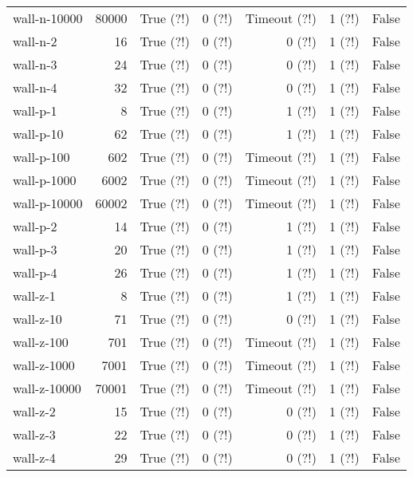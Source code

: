 \begin{longtable}{lrlrrrl}
wall-n-10000 & 80000 & True (?!) & 0 (?!) & Timeout (?!) & 1 (?!) & False \\
wall-n-2 & 16 & True (?!) & 0 (?!) & 0 (?!) & 1 (?!) & False \\
wall-n-3 & 24 & True (?!) & 0 (?!) & 0 (?!) & 1 (?!) & False \\
wall-n-4 & 32 & True (?!) & 0 (?!) & 0 (?!) & 1 (?!) & False \\
wall-p-1 & 8 & True (?!) & 0 (?!) & 1 (?!) & 1 (?!) & False \\
wall-p-10 & 62 & True (?!) & 0 (?!) & 1 (?!) & 1 (?!) & False \\
wall-p-100 & 602 & True (?!) & 0 (?!) & Timeout (?!) & 1 (?!) & False \\
wall-p-1000 & 6002 & True (?!) & 0 (?!) & Timeout (?!) & 1 (?!) & False \\
wall-p-10000 & 60002 & True (?!) & 0 (?!) & Timeout (?!) & 1 (?!) & False \\
wall-p-2 & 14 & True (?!) & 0 (?!) & 1 (?!) & 1 (?!) & False \\
wall-p-3 & 20 & True (?!) & 0 (?!) & 1 (?!) & 1 (?!) & False \\
wall-p-4 & 26 & True (?!) & 0 (?!) & 1 (?!) & 1 (?!) & False \\
wall-z-1 & 8 & True (?!) & 0 (?!) & 1 (?!) & 1 (?!) & False \\
wall-z-10 & 71 & True (?!) & 0 (?!) & 0 (?!) & 1 (?!) & False \\
wall-z-100 & 701 & True (?!) & 0 (?!) & Timeout (?!) & 1 (?!) & False \\
wall-z-1000 & 7001 & True (?!) & 0 (?!) & Timeout (?!) & 1 (?!) & False \\
wall-z-10000 & 70001 & True (?!) & 0 (?!) & Timeout (?!) & 1 (?!) & False \\
wall-z-2 & 15 & True (?!) & 0 (?!) & 0 (?!) & 1 (?!) & False \\
wall-z-3 & 22 & True (?!) & 0 (?!) & 0 (?!) & 1 (?!) & False \\
wall-z-4 & 29 & True (?!) & 0 (?!) & 0 (?!) & 1 (?!) & False \\
\end{longtable}